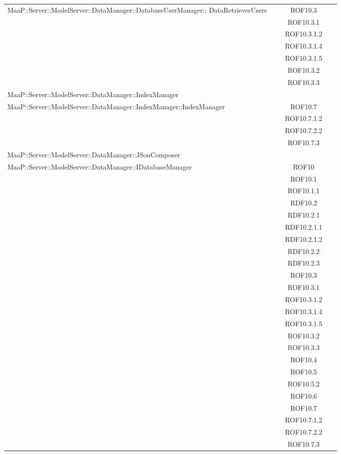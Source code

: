 \begin{center}
\begin{longtable}{|p{0.8\linewidth}|c|}
\midrule
MaaP::Server::ModelServer::DataManager::DatabaseUserManager:: DataRetrieverUsers
& ROF10.3\\
& ROF10.3.1\\
& ROF10.3.1.2\\
& ROF10.3.1.4\\
& ROF10.3.1.5\\
& ROF10.3.2\\
& ROF10.3.3\\


\midrule
MaaP::Server::ModelServer::DataManager::IndexManager
& \\

\midrule
MaaP::Server::ModelServer::DataManager::IndexManager::IndexManager
& ROF10.7\\
& ROF10.7.1.2\\
& ROF10.7.2.2\\
& ROF10.7.3\\

\midrule
MaaP::Server::ModelServer::DataManager::JSonComposer
& \\

\midrule
MaaP::Server::ModelServer::DataManager::IDatabaseManager
& ROF10\\
& ROF10.1\\
& ROF10.1.1\\
& RDF10.2\\
& RDF10.2.1\\
& RDF10.2.1.1\\
& RDF10.2.1.2\\
& RDF10.2.2\\
& RDF10.2.3\\
& ROF10.3\\
& ROF10.3.1\\
& ROF10.3.1.2\\
& ROF10.3.1.4\\
& ROF10.3.1.5\\
& ROF10.3.2\\
& ROF10.3.3\\
& ROF10.4\\
& ROF10.5\\
& ROF10.5.2\\
& ROF10.6\\
& ROF10.7\\
& ROF10.7.1.2\\
& ROF10.7.2.2\\
& ROF10.7.3\\



\end{longtable}
\end{center}
